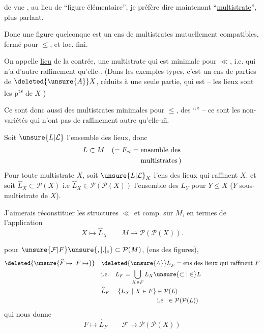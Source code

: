  de vue , au lieu de ``figure élémentaire'', je préfère dire maintenant ``\uline{multistrate}'', plus parlant.

Donc une figure quelconque est un ens de multistrates mutuellement compatibles, fermé pour $\leq$, et loc. fini.

 On appelle  \uline{lieu} de la contrée, une multistrate qui est minimale pour $\ll$, i.e. qui n'a d'autre raffinement qu'elle-.     (Dans les exemples-types, c'est un ens de parties de $\deleted{\unsure{A}}X$, réduits à une seule partie, qui est  --  les lieux sont les p\textsuperscript{ts} de $X$ )

Ce sont donc aussi des multistrates minimales pour $\leq$,   des ``''  -- ce sont les non-variétés  qui n'ont pas de raffinement autre qu'elle-\={m}.

Soit $\unsure{L|\mathcal{L}}$ l'ensemble des lieux,  donc
\[
\begin{aligned}
L\subset M\quad (={}&F_{el}=\text{ensemble des}\\
&\hphantom{F_{el}={}}\text{multistrates}\,)
\end{aligned}
\]
 Pour toute multistrate $X$, soit $\unsure{L|\mathcal{L}}_X$  l'ens des lieux qui raffinent $X$.
et soit $\widehat L_X\subset\mathcal P(X)$ i.e $\widehat L_X\in\mathcal P(\mathcal P(X))$ l'ensemble des  $L_Y$ pour $Y\leq X$ ($Y$ sous-multistrate de $X$).  

J'aimerais réconstituer les structures $\ll$ et comp. sur $M$, en termes de l'application
\[
 X\longmapsto\widehat L_X\qquad M\longrightarrow\mathcal P(\mathcal P(X)).
\]

  pour $\unsure{\mathcal F|F}\unsure{,|.|{}_{e}}\subset\mathcal P(M)$, (ens des figures),  
\[
\begin{aligned}
\deleted{\unsure{\widehat F\mapsto|F\mapsto}}\quad &{\deleted{\unsure{\wedge}}L}_F=\text{ens des lieux qui raffinent }F\\
 &\text{i.e.}\quad L_F=\bigcup_{X\in F}L_X\unsure{\subset|\in} L\\
 &\widehat L_F=\{L_X\mid X\in F\}\in\mathcal P(L)\\
 &\hspace{9em}\text{i.e.}\ \in\mathcal P(\mathcal P(L))
\end{aligned}
\]
qui nous donne
\[
 F\longmapsto\widehat L_F\qquad \mathcal F\longrightarrow\mathcal P(\mathcal P(X))
\]

